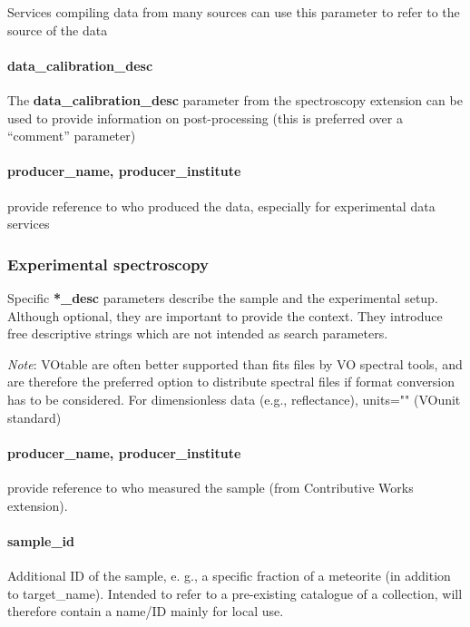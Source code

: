 \documentclass[11pt,a4paper]{ivoa}
\begin{document}
Services compiling data from many sources can use this\textbf{ }parameter to refer to the source of the data

\paragraph{data\_calibration\_desc}

The\textbf{ \textbf{data\_calibration\_desc}} parameter from the spectroscopy extension can be used to provide information on post-processing (this is preferred over a ``comment'' parameter)

\paragraph{producer\_name, producer\_institute\\}

provide reference to who produced the data, especially for experimental data services

\subsubsection{Experimental spectroscopy}

Specific \textbf{*\_desc} parameters describe the sample and the experimental setup. Although optional, they are important to provide the context. They introduce free descriptive strings which are not intended as search parameters.

\emph{Note}: VOtable are often better supported than fits files by VO spectral tools, and are therefore the preferred option to distribute spectral files if format conversion has to be considered. For dimensionless data (e.g., reflectance), units="" (VOunit standard)

\paragraph{producer\_name, producer\_institute}

provide reference to who measured the sample (from Contributive Works extension).

\paragraph{sample\_id}

Additional ID of the sample, e. g., a specific fraction of a meteorite (in addition to target\_name). Intended to refer to a pre-existing catalogue of a collection, will therefore contain a name/ID mainly for local use. 
\end{document}
